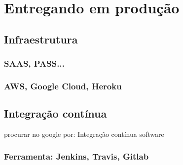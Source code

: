 \chapter{Entregando em produção}

\section{Infraestrutura}

\subsection{SAAS, PASS...}

\subsection{AWS, Google Cloud, Heroku}

\section{Integração contínua}

procurar no google por: Integração contínua software

\subsection{Ferramenta: Jenkins, Travis, Gitlab}

